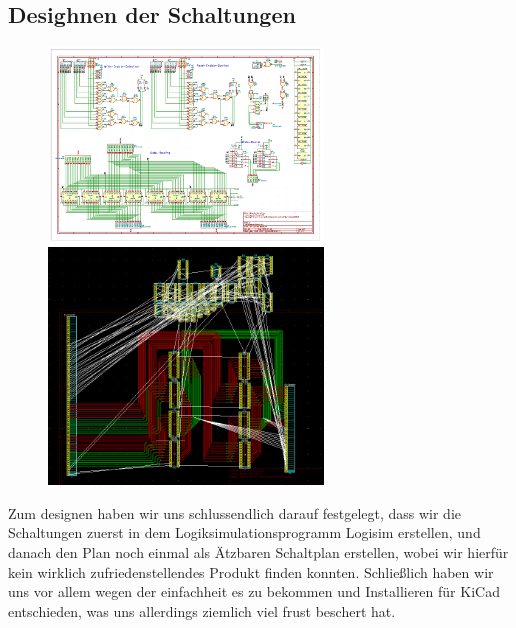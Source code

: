 \documentclass{scrartcl}
\begin{document}
    \subsection{Desighnen der Schaltungen}

        \begin{figure}
        \vspace{-40pt}
        \begin{center}
        \includegraphics[width=0.65\textwidth]{kicad_schematic}
        \includegraphics[width=0.65\textwidth]{kicad_pcb}
        \end{center}
        \vspace{-20pt}
        \end{figure}
    Zum designen haben wir uns schlussendlich darauf festgelegt, dass wir die Schaltungen zuerst in dem Logiksimulationsprogramm Logisim erstellen,
    und danach den Plan noch einmal als Ätzbaren Schaltplan erstellen, wobei wir hierfür kein wirklich zufriedenstellendes Produkt finden konnten.
    Schließlich haben wir uns vor allem wegen der einfachheit es zu bekommen und Installieren für KiCad entschieden, was uns allerdings ziemlich viel frust beschert hat.
\end{document}
